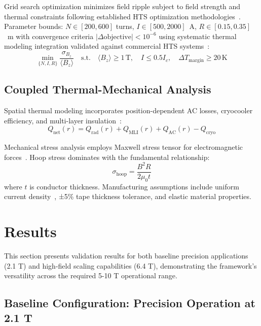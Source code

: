 \documentclass[aps,prb,preprint,amsmath,amssymb]{revtex4-2}
\begin{document}
Grid search optimization minimizes field ripple subject to field strength and thermal constraints following established HTS optimization methodologies~\cite{iwasa2009cryogenic}. Parameter bounds: $N \in [200,600]$ turns, $I \in [500,2000]$~A, $R \in [0.15,0.35]$~m with convergence criteria $|\Delta \text{objective}| < 10^{-6}$ using systematic thermal modeling integration validated against commercial HTS systems~\cite{hahn2019}:
\begin{equation}
\min_{\{N,I,R\}} \frac{\sigma_{B_z}}{\langle B_z \rangle} \quad \text{s.t.} \quad \langle B_z \rangle \geq 1\,\text{T}, \quad I \leq 0.5 I_c, \quad \Delta T_{\text{margin}} \geq 20\,\text{K}
\end{equation}

\subsection{Coupled Thermal-Mechanical Analysis}

Spatial thermal modeling incorporates position-dependent AC losses, cryocooler efficiency, and multi-layer insulation~\cite{iwasa2009cryogenic}:
\begin{equation}
Q_{\text{net}}(r) = Q_{\text{rad}}(r) + Q_{\text{MLI}}(r) + Q_{\text{AC}}(r) - Q_{\text{cryo}}
\end{equation}

Mechanical stress analysis employs Maxwell stress tensor for electromagnetic forces~\cite{zhou2023}. Hoop stress dominates with the fundamental relationship:
\begin{equation}
\sigma_{\text{hoop}} = \frac{B^2R}{2\mu_0 t}
\label{eq:hoop_stress}
\end{equation}
where $t$ is conductor thickness. Manufacturing assumptions include uniform current density~\cite{superpower2022}, ±5\% tape thickness tolerance, and elastic material properties.

\section{Results}

This section presents validation results for both baseline precision applications (2.1 T) and high-field scaling capabilities (6.4 T), demonstrating the framework's versatility across the required 5-10 T operational range.

\subsection{Baseline Configuration: Precision Operation at 2.1 T}
\end{document}
